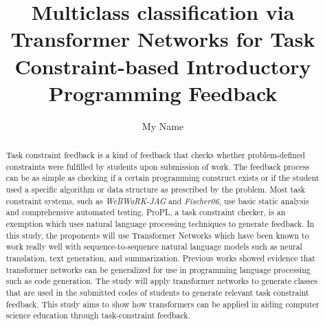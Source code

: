 \documentclass[oneside]{etd}
\title{Multiclass classification via Transformer Networks for Task Constraint-based Introductory Programming Feedback}
\author{My Name}
\begin{document}
\maketitle
\makerecomm
\makeacceptance
\makedeclaration

\begin{abstract}
	Task constraint feedback is a kind of feedback that checks whether problem-defined 
	constraints were fulfilled by students upon submission of work. The feedback process 
	can be as simple as checking if a certain programming construct exists or if the 
	student used a specific algorithm or data structure as prescribed by the problem. 
	Most task constraint systems, such as \textit{WeBWoRK-JAG} and \textit{Fischer06}, use basic static 
	analysis and comprehensive automated testing. ProPL, a task constraint checker, is 
	an exemption which uses natural language processing techniques to generate feedback. 
	In this study, the proponents will use Transformer Networks which have been known to 
	work really well with sequence-to-sequence natural language models such as neural 
	translation, text generation, and summarization. Previous works showed evidence 
	that transformer networks can be generalized for use in programming language processing 
	such as code generation. The study will apply transformer networks to generate classes 
	that are used in the submitted codes of students to generate relevant task constraint 
	feedback. This study aims to show how transformers can be applied in aiding computer 
	science education through task-constraint feedback.
\end{abstract}

	



\begingroup
\renewcommand*{\addvspace}[1]{}
\tableofcontents
\endgroup

\beginbody
{}





% 
% 

\appendix

% 
% 
% 
% 
% 

\nocite{*}





% 
\end{document}
